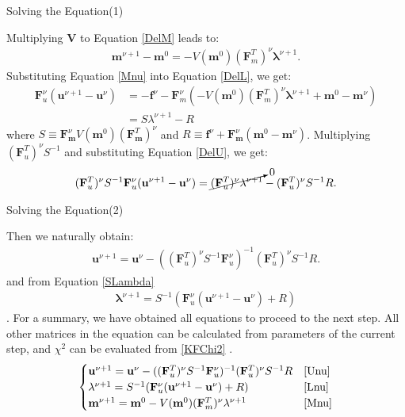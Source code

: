 \documentclass[
	xcolor=dvipsnames,
	10pt, 
	]{beamer}
\begin{document}
\begin{frame}{Solving the Equation(1)}
	\begin{block}{}
		Multiplying \textbf V to Equation \eqref{DelM} leads to:
		\begin{align}
			\mathbf{m}^{\nu+1}-\mathbf{m}^0=-V(\mathbf m^0)(\mathbf{F}_m^T)^\nu\mathbf\lambda^{\nu+1}.\label{Mnu}
		\end{align}
		Substituting Equation \eqref{Mnu} into Equation \eqref{DelL}, we get:
		\begin{align}
			\mathbf F^\nu_u(\mathbf u^{\nu+1}-\mathbf u^\nu) &= - \mathbf f^\nu - \mathbf F^\nu_m (-V(\mathbf m^0)(\mathbf{F}_m^T)^\nu\mathbf\lambda^{\nu+1} +\mathbf{m}^0-\mathbf{m}^\nu  )\nonumber\\
			&=  S\lambda^{\nu+1}  - R\label{SLambda}
		\end{align}
		where $S\equiv \mathbf{F}_\mathbf{m}^\nu V(\mathbf m^0)(\mathbf{F}_\mathbf{m}^T )^\nu$ and $R\equiv \mathbf f^\nu + \mathbf{F}_\mathbf{m}^\nu(\mathbf{m}^0-\mathbf{m}^\nu)$. Multiplying $(\mathbf{F}_u^T)^\nu S^{-1}$ and substituting Equation \eqref{DelU}, we get:
		\begin{align}
			(\mathbf{F}_u^T)^\nu S^{-1}\mathbf F^\nu_u(\mathbf u^{\nu+1}-\mathbf u^\nu) = \cancelto{0}{(\mathbf F_u^T)^\nu\mathbf \lambda^{\nu+1}}-(\mathbf{F}_u^T)^\nu S^{-1}R.
		\end{align}
	\end{block}
\end{frame}
\begin{frame}{Solving the Equation(2)}
	\begin{block}{}
		Then we naturally obtain:
		\begin{align}
			\mathbf{u}^{\nu+1}=\mathbf{u}^\nu - ((\mathbf{F}_u^T)^\nu S^{-1}\mathbf F^\nu_u)^{-1}(\mathbf{F}_u^T)^\nu S^{-1}R\label{Unu}.
		\end{align} 
		and from Equation \eqref{SLambda}
		\begin{align}
			\mathbf\lambda^{\nu+1} = S^{-1}(\mathbf F^\nu_u(\mathbf u^{\nu+1}-\mathbf u^\nu) + R)\label{Lnu}
		\end{align}.
		For a summary, we have obtained all equations to proceed to the next step. All other matrices in the equation can be calculated from parameters of the current step, and $\chi^2$ can be evaluated from \eqref{KFChi2} .
		\begin{align*}
			\begin{cases}
				\mathbf{u}^{\nu+1}=\mathbf{u}^\nu - ((\mathbf{F}_u^T)^\nu S^{-1}\mathbf F^\nu_u)^{-1}(\mathbf{F}_u^T)^\nu S^{-1}R&\eqref{Unu}\\
				\mathbf\lambda^{\nu+1} = S^{-1}(\mathbf F^\nu_u(\mathbf u^{\nu+1}-\mathbf u^\nu) + R)&\eqref{Lnu}\\
				\mathbf{m}^{\nu+1}=\mathbf{m}^0-V(\mathbf m^0)(\mathbf{F}_m^T)^\nu\mathbf\lambda^{\nu+1}&\eqref{Mnu}
			\end{cases}
		\end{align*}
	\end{block}
\end{frame}
\end{document}
